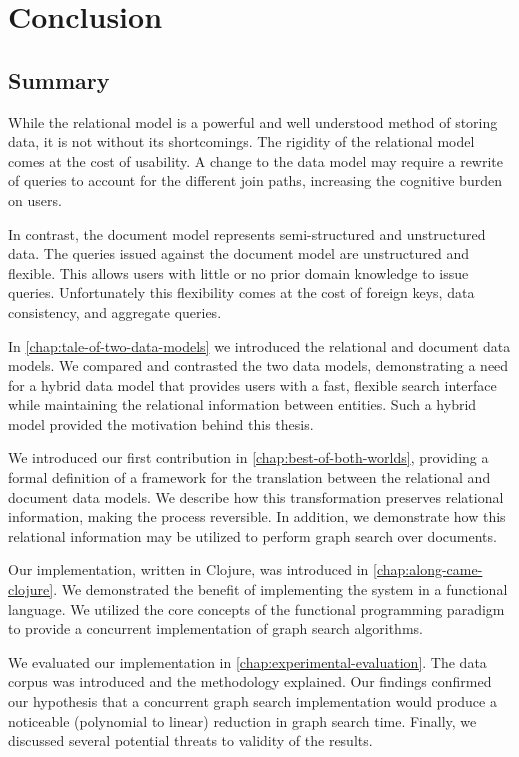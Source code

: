 \chapter{Conclusion}
\label{chap:conclusion}
	\section{Summary}
		While the relational model is a powerful and well understood method of storing data, it is not without its shortcomings.  The rigidity of the relational model comes at the cost of usability.  A change to the data model may require a rewrite of queries to account for the different join paths, increasing the cognitive burden on users.
		
		In contrast, the document model represents semi-structured and unstructured data.  The queries issued against the document model are unstructured and flexible.  This allows users with little or no prior domain knowledge to issue queries.  Unfortunately this flexibility comes at the cost of foreign keys, data consistency, and aggregate queries.
		
		In \cref{chap:tale-of-two-data-models} we introduced the relational and document data models.  We compared and contrasted the two data models, demonstrating a need for a hybrid data model that provides users with a fast, flexible search interface while maintaining the relational information between entities.  Such a hybrid model provided the motivation behind this thesis.
		
		We introduced our first contribution in \cref{chap:best-of-both-worlds}, providing a formal definition of a framework for the translation between the relational and document data models.  We describe how this transformation preserves relational information, making the process reversible.  In addition, we demonstrate how this relational information may be utilized to perform graph search over documents.
		
		Our implementation, written in Clojure, was introduced in \cref{chap:along-came-clojure}.  We demonstrated the benefit of implementing the system in a functional language.  We utilized the core concepts of the functional programming paradigm to provide a concurrent implementation of graph search algorithms.
		
		We evaluated our implementation in \cref{chap:experimental-evaluation}.  The data corpus was introduced and the methodology explained.  Our findings confirmed our hypothesis that a concurrent graph search implementation would produce a noticeable (polynomial to linear) reduction in graph search time.  Finally, we discussed several potential threats to validity of the results.
	
